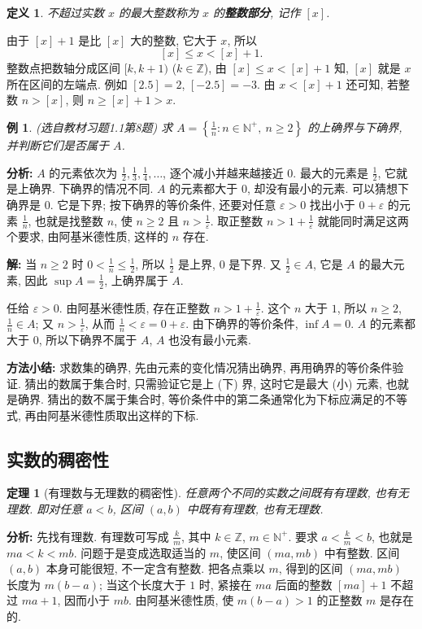 \documentclass[UTF8,openany]{ctexbook}
\theoremstyle{chinesetextbook}
\newtheorem{definition}{定义}[section]
\newtheorem{example}{例}[section]
\newtheorem{theorem}{定理}[section]
\newenvironment{cnsolution}{\par\indent\textbf{解:} \ignorespaces}{\par}
\begin{document}
\begin{definition}
不超过实数 $x$ 的最大整数称为 $x$ 的\textbf{整数部分}, 记作 $[x]$.
\end{definition}
由于 $[x]+1$ 是比 $[x]$ 大的整数, 它大于 $x$, 所以
\[
[x]\le x<[x]+1.
\]
整数点把数轴分成区间 $[k,k+1)$ ($k\in\mathbb Z$), 由 $[x]\le x<[x]+1$ 知, $[x]$ 就是 $x$ 所在区间的左端点. 例如 $[2.5]=2$, $[-2.5]=-3$. 由 $x<[x]+1$ 还可知, 若整数 $n>[x]$, 则 $n\ge[x]+1>x$.
\begin{example}
\textnormal{(选自教材习题1.1第8题)} 求 $\displaystyle A=\left\{\frac1n:n\in\mathbb N^+,\ n\ge2\right\}$ 的上确界与下确界, 并判断它们是否属于 $A$.
\end{example}
\par\indent\textbf{分析:} $A$ 的元素依次为 $\displaystyle\frac12,\frac13,\frac14,\ldots$, 逐个减小并越来越接近 $0$. 最大的元素是 $\displaystyle\frac12$, 它就是上确界. 下确界的情况不同. $A$ 的元素都大于 $0$, 却没有最小的元素. 可以猜想下确界是 $0$. 它是下界; 按下确界的等价条件, 还要对任意 $\varepsilon>0$ 找出小于 $0+\varepsilon$ 的元素 $\displaystyle\frac1n$, 也就是找整数 $n$, 使 $n\ge2$ 且 $\displaystyle n>\frac1\varepsilon$. 取正整数 $\displaystyle n>1+\frac1\varepsilon$ 就能同时满足这两个要求, 由阿基米德性质, 这样的 $n$ 存在.
\begin{cnsolution}
当 $n\ge2$ 时 $\displaystyle0<\frac1n\le\frac12$, 所以 $\displaystyle\frac12$ 是上界, $0$ 是下界. 又 $\displaystyle\frac12\in A$, 它是 $A$ 的最大元素, 因此 $\displaystyle\sup A=\frac12$, 上确界属于 $A$.

任给 $\varepsilon>0$. 由阿基米德性质, 存在正整数 $\displaystyle n>1+\frac1\varepsilon$. 这个 $n$ 大于 $1$, 所以 $n\ge2$, $\displaystyle\frac1n\in A$; 又 $\displaystyle n>\frac1\varepsilon$, 从而 $\displaystyle\frac1n<\varepsilon=0+\varepsilon$. 由下确界的等价条件, $\inf A=0$. $A$ 的元素都大于 $0$, 所以下确界不属于 $A$, $A$ 也没有最小元素.
\end{cnsolution}
\par\indent\textbf{方法小结:} 求数集的确界, 先由元素的变化情况猜出确界, 再用确界的等价条件验证. 猜出的数属于集合时, 只需验证它是上 (下) 界, 这时它是最大 (小) 元素, 也就是确界. 猜出的数不属于集合时, 等价条件中的第二条通常化为下标应满足的不等式, 再由阿基米德性质取出这样的下标.
\subsection{实数的稠密性}
\begin{theorem}[有理数与无理数的稠密性]
任意两个不同的实数之间既有有理数, 也有无理数. 即对任意 $a<b$, 区间 $(a,b)$ 中既有有理数, 也有无理数.
\end{theorem}
\par\indent\textbf{分析:} 先找有理数. 有理数可写成 $\displaystyle\frac km$, 其中 $k\in\mathbb Z$, $m\in\mathbb N^+$. 要求 $\displaystyle a<\frac km<b$, 也就是 $ma<k<mb$. 问题于是变成选取适当的 $m$, 使区间 $(ma,mb)$ 中有整数. 区间 $(a,b)$ 本身可能很短, 不一定含有整数. 把各点乘以 $m$, 得到的区间 $(ma,mb)$ 长度为 $m(b-a)$; 当这个长度大于 $1$ 时, 紧接在 $ma$ 后面的整数 $[ma]+1$ 不超过 $ma+1$, 因而小于 $mb$. 由阿基米德性质, 使 $m(b-a)>1$ 的正整数 $m$ 是存在的.
\end{document}
